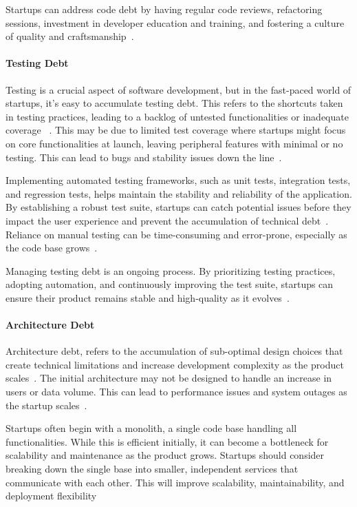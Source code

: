 Startups can address code debt by having regular code reviews, refactoring sessions, investment in developer education and training, and fostering a culture of quality and craftsmanship~\cite{10043622, Acknowle63:online}.

\paragraph{Testing Debt}
Testing is a crucial aspect of software development, but in the fast-paced world of startups, it's easy to accumulate testing debt.
This refers to the shortcuts taken in testing practices, leading to a backlog of untested functionalities or inadequate coverage ~\cite{Howtohan98:online}.
This may be due to limited test coverage where startups might focus on core functionalities at launch, leaving peripheral features with minimal or no testing.
This can lead to bugs and stability issues down the line~\cite{Totalqua26:online}.

Implementing automated testing frameworks, such as unit tests, integration tests, and regression tests, helps maintain the stability and reliability of the application.
By establishing a robust test suite, startups can catch potential issues before they impact the user experience and prevent the accumulation of technical debt~\cite{TheImpac54:online}.
Reliance on manual testing can be time-consuming and error-prone, especially as the code base grows~\cite{Howtohan98:online}.

Managing testing debt is an ongoing process.
By prioritizing testing practices, adopting automation, and continuously improving the test suite, startups can ensure their product remains stable and high-quality as it evolves~\cite{CrowneWhyStartupsFail, 1NewMess49:online}.

\paragraph{Architecture Debt}
Architecture debt, refers to the accumulation of sub-optimal design choices that create technical limitations and increase development complexity as the product scales~\cite{Startups4:online}.
The initial architecture may not be designed to handle an increase in users or data volume.
This can lead to performance issues and system outages as the startup scales~\cite{Qualityv77:online}.

Startups often begin with a monolith, a single code base handling all functionalities.
While this is efficient initially, it can become a bottleneck for scalability and maintenance as the product grows.
Startups should consider breaking down the single base into smaller, independent services that communicate with each other.
This will improve scalability, maintainability, and deployment flexibility~\cite{Howtohan98:online, DesignSt86:online}

